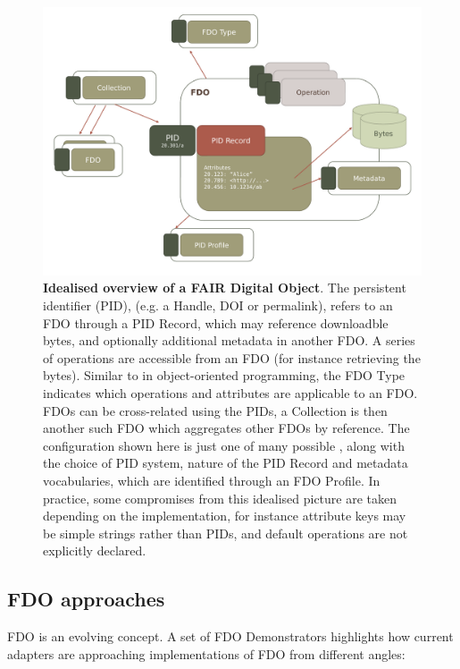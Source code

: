\begin{figure}[hbt]
  \includegraphics[width=\textwidth]{figures/ch03/fdo.pdf}
    \caption[Idealised overview of a FAIR Digital Object]{\textbf{Idealised overview of a FAIR Digital Object}. The persistent identifier (PID), (e.g. a Handle, DOI or permalink), refers to an FDO through a PID Record, which may reference downloadble bytes, and optionally additional metadata in another FDO. A series of operations are accessible from an FDO (for instance retrieving the bytes). Similar to in object-oriented programming, the FDO Type indicates which operations and attributes are applicable to an FDO. FDOs can be cross-related using the PIDs, a Collection is then another such FDO which aggregates other FDOs by reference. The configuration shown here is just one of many possible \cite{Lannom 2022a}, along with the choice of PID system, nature of the PID Record and metadata vocabularies, which are identified through an FDO Profile. In practice, some compromises from this idealised picture are taken depending on the implementation, for instance attribute keys may be simple strings rather than PIDs, and default operations are not explicitly declared.
    }
  \label{ch3:fig:fdo}
\end{figure}

\subsection{FDO approaches}\label{ch3:fdo-approaches}

FDO is an evolving concept. A set of FDO Demonstrators \cite{Wittenburg 2022a} highlights how current adapters are approaching implementations of FDO from different angles:

